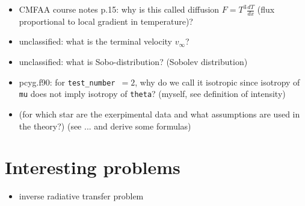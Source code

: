 \documentclass[../main/main.tex]{subfiles}
\begin{document}
\begin{itemize}
\item CMFAA course notes p.15: why is this called diffusion $F=T^3 \frac{dT}{dx}$ (flux proportional to local gradient in temperature)?

\item unclassified: what is the terminal velocity $v_{\infty}$?

\item unclassified: what is Sobo-distribution? (Sobolev distribution)

\item pcyg.f90: for \texttt{test\_number $= 2$}, why do we call it isotropic since isotropy of \texttt{mu} does not imply isotropy of \texttt{theta}? (myself, see definition of intensity)

\item (for which star are the exerpimental data and what assumptions are used in the theory?) (see ... and derive some formulas)
\end{itemize}

\newpage
\section{Interesting problems}
\begin{itemize}
\item inverse radiative transfer problem
\end{itemize}
\end{document}
